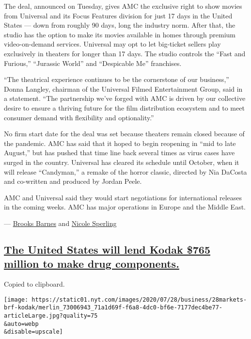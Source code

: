 The deal, announced on Tuesday, gives AMC the exclusive right to show
movies from Universal and its Focus Features division for just 17 days
in the United States --- down from roughly 90 days, long the industry
norm. After that, the studio has the option to make its movies available
in homes through premium video-on-demand services. Universal may opt to
let big-ticket sellers play exclusively in theaters for longer than 17
days. The studio controls the ``Fast and Furious,'' ``Jurassic World''
and ``Despicable Me'' franchises.

``The theatrical experience continues to be the cornerstone of our
business,'' Donna Langley, chairman of the Universal Filmed
Entertainment Group, said in a statement. ``The partnership we've forged
with AMC is driven by our collective desire to ensure a thriving future
for the film distribution ecosystem and to meet consumer demand with
flexibility and optionality.''

No firm start date for the deal was set because theaters remain closed
because of the pandemic. AMC has said that it hoped to begin reopening
in ``mid to late August,'' but has pushed that time line back several
times as virus cases have surged in the country. Universal has cleared
its schedule until October, when it will release ``Candyman,'' a remake
of the horror classic, directed by Nia DaCosta and co-written and
produced by Jordan Peele.

AMC and Universal said they would start negotiations for international
releases in the coming weeks. AMC has major operations in Europe and the
Middle East.

--- \href{https://www.nytimes.com/by/brooks-barnes}{Brooks Barnes} and
\href{https://www.nytimes.com/by/nicole-sperling}{Nicole Sperling}

\hypertarget{the-united-states-will-lend-kodak-765-million-to-make-drug-components}{%
\subsection{\texorpdfstring{\protect\hyperlink{the-united-states-will-lend-kodak-765-million-to-make-drug-components}{The
United States will lend Kodak \$765 million to make drug
components.}}{The United States will lend Kodak \$765 million to make drug components.}}\label{the-united-states-will-lend-kodak-765-million-to-make-drug-components}}

Copied to clipboard.

\texttt{[image: https://static01.nyt.com/images/2020/07/28/business/28markets-brf-kodak/merlin\_73006943\_71a1d69f-f6a8-4dc0-bf6e-7177dec4be77-articleLarge.jpg?quality=75\\\&auto=webp\\\&disable=upscale]}

